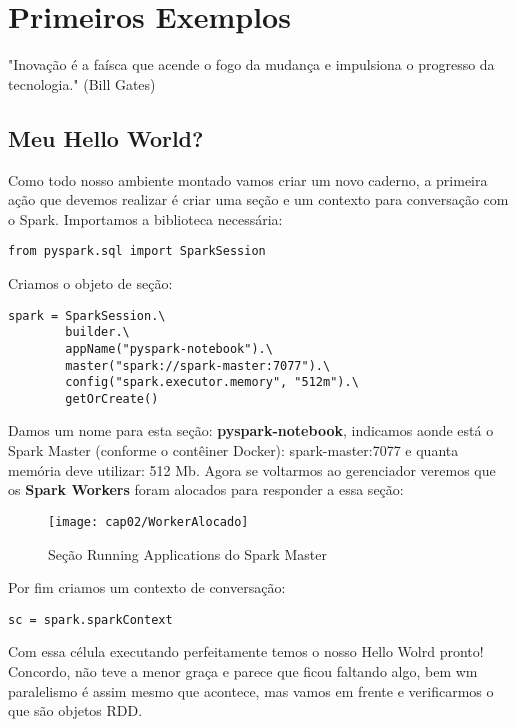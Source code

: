 \chapter{Primeiros Exemplos}

\begin{remark}
"Inovação é a faísca que acende o fogo da mudança e impulsiona o progresso da tecnologia." (Bill Gates) 
\end{remark}

\section{Meu Hello World?}
Como todo nosso ambiente montado vamos criar um novo caderno, a primeira ação que devemos realizar é criar uma seção e um contexto para conversação com o Spark. Importamos a biblioteca necessária:
\begin{lstlisting}[]
from pyspark.sql import SparkSession
\end{lstlisting}

Criamos o objeto de seção:
\begin{lstlisting}[]
spark = SparkSession.\
        builder.\
        appName("pyspark-notebook").\
        master("spark://spark-master:7077").\
        config("spark.executor.memory", "512m").\
        getOrCreate()
\end{lstlisting}

Damos um nome para esta seção: \textbf{pyspark-notebook}, indicamos aonde está o Spark Master (conforme o contêiner Docker): spark-master:7077 e quanta memória deve utilizar: 512 Mb. Agora se voltarmos ao gerenciador veremos que os \textbf{Spark Workers} foram alocados para responder a essa seção:
\begin{figure}[H]
	\centering\texttt{[image: cap02/WorkerAlocado]}
	\caption{Seção Running Applications do Spark Master}
\end{figure}

Por fim criamos um contexto de conversação:
\begin{lstlisting}[]
sc = spark.sparkContext
\end{lstlisting}

Com essa célula executando perfeitamente temos o nosso Hello Wolrd pronto! Concordo, não teve a menor graça e parece que ficou faltando algo, bem wm paralelismo é assim mesmo que acontece, mas vamos em frente e verificarmos o que são objetos RDD.

